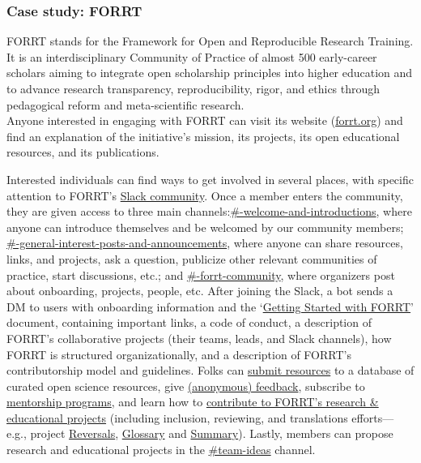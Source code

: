\documentclass[
  letterpaper,
  DIV=11,
  numbers=noendperiod]{scrreport}
\begin{document}
\hypertarget{case-study-forrt}{%
\subsubsection{Case study: FORRT}\label{case-study-forrt}}

FORRT stands for the Framework for Open and Reproducible Research
Training. It is an interdisciplinary Community of Practice of almost 500
early-career scholars aiming to integrate open scholarship principles
into higher education and to advance research transparency,
reproducibility, rigor, and ethics through pedagogical reform and
meta-scientific research.\\
Anyone interested in engaging with FORRT can visit its website
(\href{https://forrt.org/}{forrt.org}) and find an explanation of the
initiative's mission, its projects, its open educational resources, and
its publications.

Interested individuals can find ways to get involved in several places,
with specific attention to FORRT's
\href{https://join.slack.com/t/forrt/shared_invite/zt-alobr3z7-NOR0mTBfD1vKXn9qlOKqaQ}{Slack
community}. Once a member enters the community, they are given access to
three main
channels:\href{https://forrt.slack.com/archives/CM8812VSS}{\#-welcome-and-introductions},
where anyone can introduce themselves and be welcomed by our community
members;
\href{https://forrt.slack.com/archives/CM63UEYF7}{\#-general-interest-posts-and-announcements},
where anyone can share resources, links, and projects, ask a question,
publicize other relevant communities of practice, start discussions,
etc.; and
\href{https://forrt.slack.com/archives/CM6344P5E}{\#-forrt-community},
where organizers post about onboarding, projects, people, etc. After
joining the Slack, a bot sends a DM to users with onboarding information
and the
`\href{https://docs.google.com/document/d/17ECRs6J8spO3CU6siheGL8weQ-TzdyAUpXIiIE8cUeI/edit?usp=sharing}{Getting
Started with FORRT}' document, containing important links, a code of
conduct, a description of FORRT's collaborative projects (their teams,
leads, and Slack channels), how FORRT is structured organizationally,
and a description of FORRT's contributorship model and guidelines. Folks
can \href{https://forrt.org/resources}{submit resources} to a database
of curated open science resources, give
\href{https://forrt.org/feedback/}{(anonymous) feedback}, subscribe to
\href{https://forrt.org/dei}{mentorship programs}, and learn how to
\href{https://forrt.org/about/get-involved/}{contribute to FORRT's
research \& educational projects} (including inclusion, reviewing, and
translations efforts--- e.g., project
\href{https://forrt.org/reversals}{Reversals},
\href{https://forrt.org/glossary}{Glossary} and
\href{https://forrt.org/summaries}{Summary}). Lastly, members can
propose research and educational projects in the
\href{https://forrt.org/reversals}{\#team-ideas} channel.
\end{document}
